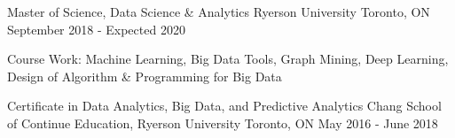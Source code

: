 

\begin{cventries}

  \cventry
    {Master of Science, Data Science \& Analytics} %
    {Ryerson University} %
    {Toronto, ON} %
    {September 2018 - Expected 2020} %
    {
      \begin{cvitems} %
      \item {Course Work: Machine Learning, Big Data Tools, Graph Mining, Deep Learning, Design of Algorithm \& Programming for Big Data}
      \end{cvitems}
    }

 \cventry
    {Certificate in Data Analytics, Big Data, and Predictive Analytics} 
    {Chang School of Continue Education, Ryerson University} %
    {Toronto, ON} %
    {May 2016 - June 2018} %
    {}

    
 \end{cventries}   

